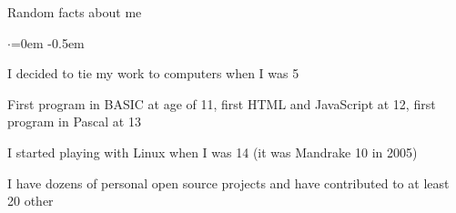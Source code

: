 \documentclass{resume} %
\begin{document}
\begin{rSection}{Random facts about me}
  \smallskip
  \begin{list}{$\cdot$}{\leftmargin=0em} %
    \itemsep -0.5em \vspace{-0.5em} %
  \item I decided to tie my work to computers when I was 5
  \item First program in BASIC at age of 11, first HTML and JavaScript at 12, first program in Pascal at 13
  \item I started playing with Linux when I was 14 (it was Mandrake 10 in 2005)
  \item I have dozens of personal open source projects and have contributed to at least 20 other
  \end{list}
\end{rSection}
\end{document}
